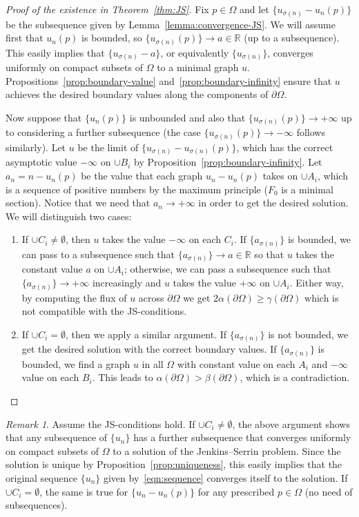 \documentclass[a4paper,10pt,reqno]{amsart}
\newcommand{\R}{\mathbb{R}}
\theoremstyle{definition}
\theoremstyle{remark}
\newtheorem{remark}[theorem]{Remark}
\numberwithin{equation}{section}
\begin{document}
\begin{proof}[Proof of the existence in Theorem~\ref{thm:JS}]
Fix $p\in\Omega$ and let $\{u_{\sigma(n)}-u_n(p)\}$ be the subsequence given by Lemma~\ref{lemma:convergence-JS}. We will assume first that $u_n(p)$ is bounded, so $\{u_{\sigma(n)}(p)\}\to a\in\R$ (up to a subsequence). This easily implies that $\{u_{\sigma(n)}-a\}$, or equivalently $\{u_{\sigma(n)}\}$, converges uniformly on compact subsets of $\Omega$ to a minimal graph $u$. Propositions~\ref{prop:boundary-value} and~\ref{prop:boundary-infinity} ensure that $u$ achieves the desired boundary values along the components of $\partial\Omega$.

Now suppose that $\{u_n(p)\}$ is unbounded and also that $\{u_{\sigma(n)}(p)\}\to+\infty$ up to considering a further subsequence (the case $\{u_{\sigma(n)}(p)\}\to-\infty$ follows similarly). Let $u$ be the limit of $\{u_{\sigma(n)}-u_{\sigma(n)}(p)\}$, which has the correct asymptotic value $-\infty$ on $\cup B_i$ by Proposition~\ref{prop:boundary-infinity}. Let $a_n=n-u_n(p)$ be the value that each graph $u_n-u_n(p)$ takes on $\cup A_i$, which is a sequence of positive numbers by the maximum principle ($F_0$ is a minimal section). Notice that we need that $a_n\to+\infty$ in order to get the desired solution. We will distinguish two cases:
\begin{enumerate}
 	\item If $\cup C_i\neq\emptyset$, then $u$ takes the value $-\infty$ on each $C_i$. If $\{a_{\sigma(n)}\}$ is bounded, we can pass to a subsequence such that $\{a_{\sigma(n)}\}\to a\in\R$ so that $u$ takes the constant value $a$ on $\cup A_i$; otherwise, we can pass a subsequence such that $\{a_{\sigma(n)}\}\to+\infty$ increasingly and $u$ takes the value $+\infty$ on $\cup A_i$. Either way, by computing the flux of $u$ across $\partial\Omega$ we get $2\alpha(\partial\Omega)\geq \gamma(\partial\Omega)$ which is not compatible with the JS-conditions.
 	\item If $\cup C_i=\emptyset$, then we apply a similar argument. If $\{a_{\sigma(n)}\}$ is not bounded, we get the desired solution with the correct boundary values. If $\{a_{\sigma(n)}\}$ is bounded, we find a graph $u$ in all $\Omega$ with constant value on each $A_i$ and $-\infty$ value on each $B_i$. This leads to $\alpha(\partial\Omega)>\beta(\partial\Omega)$, which is a contradiction.\qedhere
 \end{enumerate}
\end{proof}


\begin{remark}
Assume the JS-conditions hold. If $\cup C_i\neq\emptyset$, the above argument shows that any subsequence of $\{u_n\}$ has a further subsequence that converges uniformly on compact subsets of $\Omega$ to a solution of the Jenkins--Serrin problem. Since the solution is unique by Proposition~\ref{prop:uniqueness}, this easily implies that the original sequence $\{u_n\}$ given by~\eqref{eqn:sequence} converges itself to the solution. If $\cup C_i=\emptyset$, the same is true for $\{u_n-u_n(p)\}$ for any prescribed $p\in\Omega$ (no need of subsequences).
\end{remark}
\end{document}
